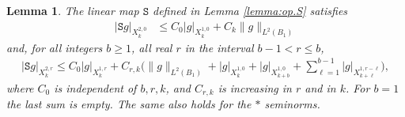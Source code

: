 \documentclass[10pt,reqno,a4paper]{article}
\numberwithin{equation}{section}
\theoremstyle{plain}
\newtheorem{lemma}[theorem]{Lemma}
\theoremstyle{definition}
\begin{document}
\begin{lemma} \label{lemma:pinoli.S}
The linear map $\mathtt S$ defined in Lemma \ref{lemma:op.S} satisfies 
\begin{align}
|\mathtt S g|_{X^{2,0}_k} 
& \leq C_0 |g|_{X^{1,0}_k} + C_k \| g \|_{L^2(B_1)} 
\label{pinoli.15}
\end{align}
and, for all integers $b \geq 1$, all real $r$ in the interval $b-1 < r \leq b$, 
\begin{align} 
|\mathtt S g|_{X^{2,r}_k} \leq 
C_0 |g|_{X^{1,r}_k}
+ C_{r,k} \Big( \| g \|_{L^2(B_1)}
+ |g|_{X^{1,0}_k}
+ |g|_{X^{1,0}_{k+b}}
+ \sum_{\ell=1}^{b-1} |g|_{X^{1,r-\ell}_{k+\ell}} \Big),
\label{pinoli.16}
\end{align}
where $C_0$ is independent of $b,r,k$,  
and $C_{r,k}$ is increasing in $r$ and in $k$. 
For $b=1$ the last sum is empty.
The same also holds for the $*$ seminorms. 
\end{lemma}
\end{document}

